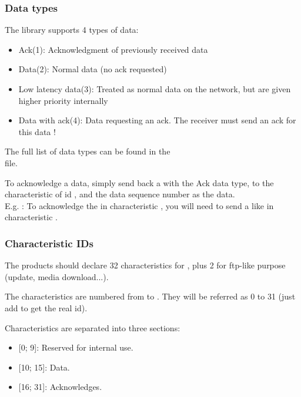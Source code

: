 \subsubsection{Data types}

The  library supports 4 types of data:
\begin{itemize}
\item{Ack(1): Acknowledgment of previously received data} 
\item{Data(2): Normal data (no ack requested)}
\item{Low latency data(3): Treated as normal data on the network, but are given higher priority internally}
\item{Data with ack(4): Data requesting an ack. The receiver must send an ack for this data !}
\end{itemize}

The full list of data types can be found in the\\
 file.


To acknowledge a data, simply send back a  with the Ack data type, to the characteristic of id , and the data sequence number as the data.\\
E.g. : To acknowledge the   in characteristic , you will need to send a  like  in characteristic .

\subsubsection{Characteristic IDs}


The products should declare 32 characteristics for , plus 2 for ftp-like purpose (update, media download...).


The  characteristics are numbered from  to . They will be referred as 0 to 31 (just add  to get the real id).


Characteristics are separated into three sections:
\begin{itemize}
\item{[0; 9]: Reserved for  internal use.}
\item{[10; 15]: Data.}
\item{[16; 31]: Acknowledges.}
\end{itemize}

